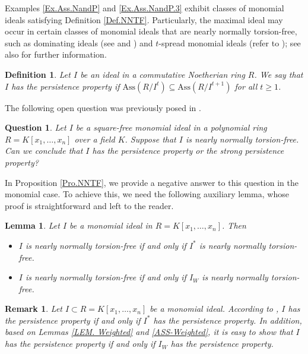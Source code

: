 \documentclass[11pt]{amsart}
\newtheorem{question}[theorem]{Question}
\newtheorem{lemma}[theorem]{Lemma}
\newtheorem{definition}[theorem]{Definition}
\newtheorem{remark}[theorem]{Remark}
\begin{document}
Examples  \ref{Ex.Ass.NandP}  and \ref{Ex.Ass.NandP.3}  exhibit classes of monomial ideals satisfying Definition \ref{Def.NNTF}. 
Particularly,  the maximal ideal may occur in certain classes of monomial ideals that are nearly normally
 torsion-free, such as dominating ideals (see \cite[Theorem 4.4]{NBR}  and \cite[Theorem 3.9]{NQBM}) and   $t$-spread
  monomial ideals (refer to \cite[Lemma 5.15]{NQKR}); see also  \cite[Theorem 4.2]{NT.2}  for further information. 
  


  
  \begin{definition}
    \em{Let $I$ be an ideal in  a commutative Noetherian ring  $R$.
 We  say that  $I$   has the \textit{persistence property} if
 $\mathrm{Ass}(R/I^t) \subseteq \mathrm{Ass}(R/I^{t+1})$ for all $t\geq 1$.
   }
  \end{definition}
  
   
The following open question was previously posed in \cite[Question 2.10]{Nasernejad-1}.
   

\begin{question}
Let $I$ be a square-free monomial ideal in a polynomial ring
$R=K[x_1,\ldots,x_n]$ over a field $K$. Suppose that $I$ is nearly normally
torsion-free. Can we conclude that $I$ has the persistence property or the
strong persistence property?     
\end{question}

  In Proposition \ref{Pro.NNTF}, we provide a negative answer to this question in the monomial case. To achieve this,   we need the following auxiliary lemma, whose proof is straightforward and left to the reader.
  
  \begin{lemma}\label{Pro.NNTF.Expansion.Weighted}
Let $I$ be a monomial ideal in $R=K[x_1,\ldots,x_n]$.   Then
\begin{itemize}
\item[(1)]   $I$ is nearly normally torsion-free if and only if  $I^*$ is nearly normally torsion-free.
\item[(2)]  $I$ is nearly normally torsion-free if and only if   $I_W$ is  nearly normally torsion-free.
\end{itemize}
\end{lemma}
 
 
 \begin{remark}\label{Rem.NNTF}
 {\em 
 Let $I\subset R=K[x_1, \ldots, x_n]$ be a monomial ideal. According to \cite[Lemma 2.9]{N3}, $I$ has the persistence property if and only if $I^*$ 
 has the persistence property. In addition, based on    Lemmas \ref{LEM. Weighted} and \ref{ASS-Weighted}, it is easy to show that $I$ has the persistence property if and only if $I_W$   has the persistence property. 
 }
 \end{remark}
     
\end{document}
